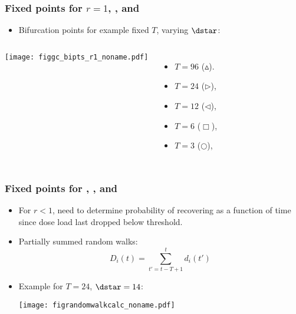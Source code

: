\begin{frame}
 \frametitle{Fixed points for $r = 1$, , and }

 \begin{itemize}
 \item 
   Bifurcation points for example fixed $T$, varying $\dstar$:
 \end{itemize}
 \begin{columns}
   \texttt{[image: figgc\_bipts\_r1\_noname.pdf]}
   \begin{itemize}
   \item 
     $T=96$ ($\vartriangle$).
   \item 
     $T=24$ ($\triangleright$),
   \item 
     $T=12$ ($\triangleleft$),
   \item 
     $T=6$ ($\Box$),
   \item 
     $T=3$ ($\bigcirc$), 
   \end{itemize}

 \end{columns}
\end{frame}




\begin{frame}
  \frametitle{Fixed points for , , and }

  \begin{itemize}
  \item<1->
    For $r < 1$, need to determine probability of
    recovering as a function of time since 
    dose load last dropped below threshold.
  \item<2->
    Partially summed random walks:
    $$
    D_i(t) = \sum_{t'=t-T+1}^{t} d_i(t')
    $$
  \item<3->
    Example for $T=24$, $\dstar=14$:
    \begin{overprint}
      \texttt{[image: figrandomwalkcalc\_noname.pdf]}
    \end{overprint}
  \end{itemize}

\end{frame}

